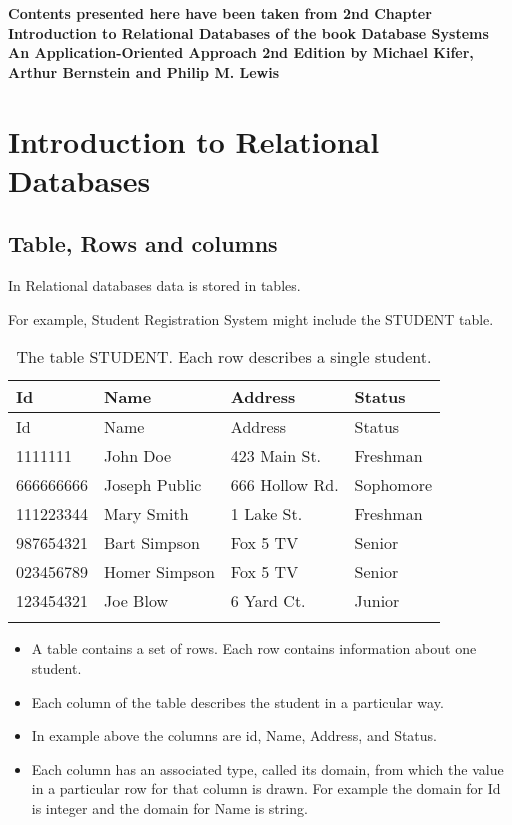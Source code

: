 \documentclass[]{article}
\date{}
\providecommand{\tightlist}{%
  \setlength{\itemsep}{0pt}\setlength{\parskip}{0pt}}
\begin{document}
\textbf{Contents presented here have been taken from 2nd Chapter
Introduction to Relational Databases of the book Database Systems An
Application-Oriented Approach 2nd Edition by Michael Kifer, Arthur
Bernstein and Philip M. Lewis }

\hypertarget{introduction-to-relational-databases}{%
\section{Introduction to Relational
Databases}\label{introduction-to-relational-databases}}

\hypertarget{table-rows-and-columns}{%
\subsection{Table, Rows and columns}\label{table-rows-and-columns}}

In Relational databases data is stored in tables.

For example, Student Registration System might include the STUDENT
table.

\begin{longtable}[]{@{}llll@{}}
\caption{The table STUDENT. Each row describes a single
student.}\tabularnewline
\toprule
Id & Name & Address & Status\tabularnewline
\midrule
\endfirsthead
\toprule
Id & Name & Address & Status\tabularnewline
\midrule
\endhead
1111111 & John Doe & 423 Main St. & Freshman\tabularnewline
666666666 & Joseph Public & 666 Hollow Rd. & Sophomore\tabularnewline
111223344 & Mary Smith & 1 Lake St. & Freshman\tabularnewline
987654321 & Bart Simpson & Fox 5 TV & Senior\tabularnewline
023456789 & Homer Simpson & Fox 5 TV & Senior\tabularnewline
123454321 & Joe Blow & 6 Yard Ct. & Junior\tabularnewline
& & &\tabularnewline
\bottomrule
\end{longtable}

\begin{itemize}
\tightlist
\item
  A table contains a set of rows. Each row contains information about
  one student.
\item
  Each column of the table describes the student in a particular way.
\item
  In example above the columns are id, Name, Address, and Status.
\item
  Each column has an associated type, called its domain, from which the
  value in a particular row for that column is drawn. For example the
  domain for Id is integer and the domain for Name is string.
\end{itemize}
\end{document}
